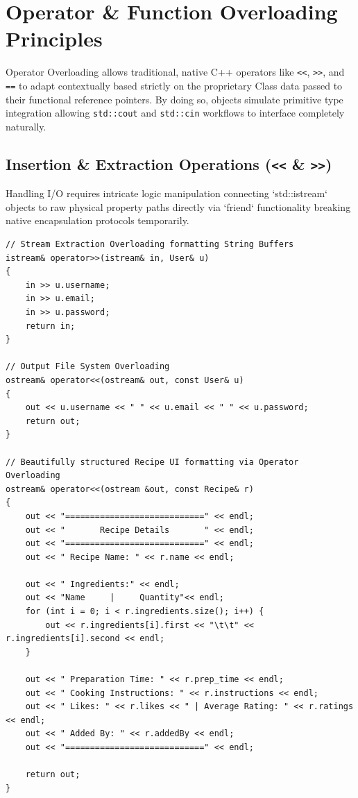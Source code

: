 \documentclass[12pt, a4paper]{article}
\begin{document}
\section{Operator \& Function Overloading Principles}

Operator Overloading allows traditional, native C++ operators like \texttt{<<}, \texttt{>>}, and \texttt{==} to adapt contextually based strictly on the proprietary Class data passed to their functional reference pointers. By doing so, objects simulate primitive type integration allowing \texttt{std::cout} and \texttt{std::cin} workflows to interface completely naturally.

\subsection{Insertion \& Extraction Operations (\texttt{<<} \& \texttt{>>})}
Handling I/O requires intricate logic manipulation connecting `std::istream` objects to raw physical property paths directly via `friend` functionality breaking native encapsulation protocols temporarily.

\begin{lstlisting}[caption={Overloading Object Input/Output Bindings}]
// Stream Extraction Overloading formatting String Buffers
istream& operator>>(istream& in, User& u) 
{
    in >> u.username;
    in >> u.email;
    in >> u.password;
    return in;
}

// Output File System Overloading
ostream& operator<<(ostream& out, const User& u) 
{
    out << u.username << " " << u.email << " " << u.password;
    return out;
}

// Beautifully structured Recipe UI formatting via Operator Overloading
ostream& operator<<(ostream &out, const Recipe& r)
{
    out << "============================" << endl;
    out << "       Recipe Details       " << endl;
    out << "============================" << endl;
    out << " Recipe Name: " << r.name << endl;
    
    out << " Ingredients:" << endl;
    out << "Name     |     Quantity"<< endl;
    for (int i = 0; i < r.ingredients.size(); i++) {
        out << r.ingredients[i].first << "\t\t" << r.ingredients[i].second << endl;
    }
    
    out << " Preparation Time: " << r.prep_time << endl;
    out << " Cooking Instructions: " << r.instructions << endl;
    out << " Likes: " << r.likes << " | Average Rating: " << r.ratings << endl;
    out << " Added By: " << r.addedBy << endl;
    out << "============================" << endl;

    return out;
}
\end{lstlisting}
\end{document}
